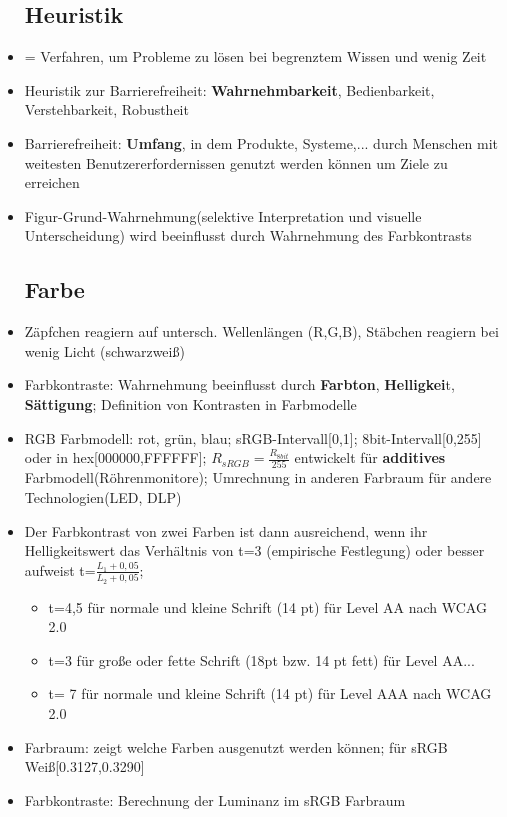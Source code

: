 \documentclass[12pt,landscape]{article}
\begin{document}
\begin{multicols}{3}
\begin{itemize}
\subsection{Heuristik}
\item = Verfahren, um Probleme zu lösen bei begrenztem Wissen und wenig Zeit
\item Heuristik zur Barrierefreiheit: \textbf{Wahrnehmbarkeit}, Bedienbarkeit, Verstehbarkeit, Robustheit
\item Barrierefreiheit: \textbf{Umfang}, in dem Produkte, Systeme,... durch Menschen mit weitesten Benutzererfordernissen genutzt werden können um Ziele zu erreichen
\item Figur-Grund-Wahrnehmung(selektive Interpretation und visuelle Unterscheidung) wird beeinflusst durch Wahrnehmung des Farbkontrasts
\subsection{Farbe}
\item Zäpfchen reagiern auf untersch. Wellenlängen (R,G,B), Stäbchen reagiern bei wenig Licht (schwarzweiß)
\item Farbkontraste: Wahrnehmung beeinflusst durch \textbf{Farbton}, \textbf{Helligkei}t, \textbf{Sättigung}; Definition von Kontrasten in Farbmodelle
\item RGB Farbmodell: rot, grün, blau; sRGB-Intervall[0,1]; 8bit-Intervall[0,255] oder in hex[000000,FFFFFF]; $R_{sRGB}=\frac{R_{8bit}}{255}$ entwickelt für \textbf{additives} Farbmodell(Röhrenmonitore); Umrechnung in anderen Farbraum für andere Technologien(LED, DLP)
\item Der Farbkontrast von zwei Farben ist dann ausreichend, wenn ihr Helligkeitswert das Verhältnis von t=3 (empirische Festlegung) oder besser aufweist t=$\frac{L_1+0,05}{L_2+0,05}$; 
\begin{itemize}
\item t=4,5 für normale und kleine Schrift (14 pt) für Level AA nach WCAG 2.0
\item t=3 für große oder fette Schrift (18pt bzw. 14 pt fett) für Level AA...
\item t= 7 für normale und kleine Schrift (14 pt) für Level AAA nach WCAG 2.0
\end{itemize}
\item Farbraum: zeigt welche Farben ausgenutzt werden können; für sRGB Weiß[0.3127,0.3290] 
\item Farbkontraste: Berechnung der Luminanz im sRGB Farbraum

\end{itemize}
\end{multicols}
\end{document}
